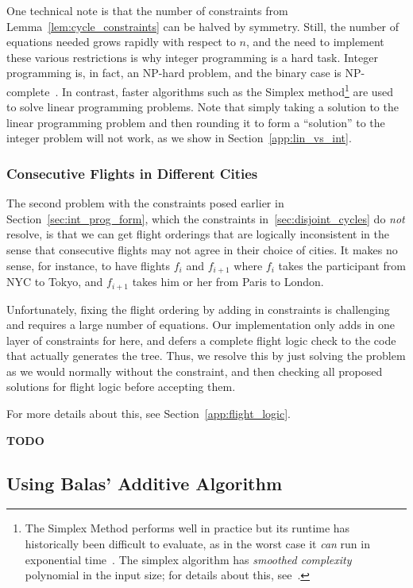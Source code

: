 \documentclass{article}
\begin{document}
One technical note is that the number of constraints from Lemma~\ref{lem:cycle_constraints} can be halved by symmetry. Still, the number of equations
needed grows rapidly with respect to $n$, and the need to implement these various restrictions is why integer programming is a hard task. Integer
programming is, in fact, an NP-hard problem, and the binary case is NP-complete~\cite{Kar72}. In contrast, faster algorithms such as the Simplex
method\footnote{The Simplex Method performs well in practice but its runtime has historically been difficult to evaluate, as in the worst case it
\emph{can} run in exponential time~\cite{Klee1972}. The simplex algorithm has \emph{smoothed complexity} polynomial in the input size; for details
about this, see~\cite{Spielman:2004:SAA:990308.990310}.} are used to solve linear programming problems. Note that simply taking a solution to the
linear programming problem and then rounding it to form a ``solution'' to the integer problem will not work, as we show in Section~\ref{app:lin_vs_int}.

\subsubsection{Consecutive Flights in Different Cities}

The second problem with the constraints posed earlier in Section~\ref{sec:int_prog_form}, which the constraints in~\ref{sec:disjoint_cycles} do
\emph{not} resolve, is that we can get flight orderings that are logically inconsistent in the sense that consecutive flights may not agree in their
choice of cities. It makes no sense, for instance, to have flights $f_i$ and $f_{i+1}$ where $f_i$ takes the participant from NYC to Tokyo, and
$f_{i+1}$ takes him or her from Paris to London.

Unfortunately, fixing the flight ordering by adding in constraints is challenging and requires a large number of equations. Our implementation only
adds in one layer of constraints for here, and defers a complete flight logic check to the code that actually generates the tree. Thus, we resolve
this by just solving the problem as we would normally without the constraint, and then checking all proposed solutions for flight logic before
accepting them.

For more details about this, see Section~\ref{app:flight_logic}.

{\bf TODO}

\subsection{Using Balas' Additive Algorithm}\label{sec:balas}
\end{document}
